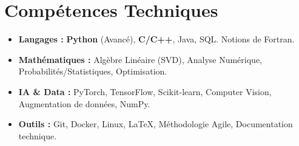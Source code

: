 \documentclass[a4paper,11pt]{article}
\begin{document}
\section{Compétences Techniques}
\begin{itemize}[leftmargin=*, nosep]
    \item \small{\textbf{Langages :} \textbf{Python} (Avancé), \textbf{C/C++}, Java, SQL. Notions de Fortran.}
    \item \small{\textbf{Mathématiques :} Algèbre Linéaire (SVD), Analyse Numérique, Probabilités/Statistiques, Optimisation.}
    \item \small{\textbf{IA \& Data :} PyTorch, TensorFlow, Scikit-learn, Computer Vision, Augmentation de données, NumPy.}
    \item \small{\textbf{Outils :} Git, Docker, Linux, LaTeX, Méthodologie Agile, Documentation technique.}
\end{itemize}

\end{document}

